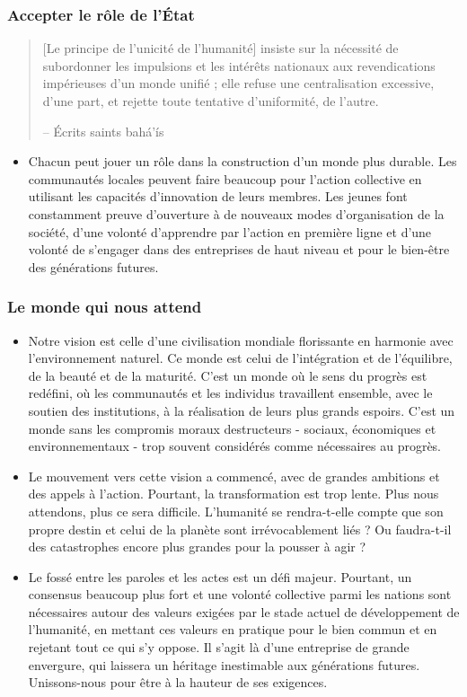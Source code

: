 \documentclass[11pt,xcolor={dvipsnames},hyperref={pdftex,pdfpagemode=UseNone,hidelinks,pdfdisplaydoctitle=true},usepdftitle=false]{beamer}
\begin{document}
\begin{frame}[allowframebreaks=0.8]
  \frametitle{Accepter le rôle de l’État}
  \begin{quote}
     [Le principe de l’unicité de l’humanité] insiste sur la nécessité de
     subordonner les impulsions et les intérêts nationaux aux revendications
     impérieuses d’un monde unifié ; elle refuse une centralisation excessive,
     d’une part, et rejette toute tentative d’uniformité, de l’autre.

    \raggedleft -- Écrits saints bahá’ís
  \end{quote}
  \begin{itemize}
    \item Chacun peut jouer un rôle dans la construction d'un monde plus
      durable. Les communautés locales peuvent faire beaucoup pour l'action
      collective en utilisant les capacités d'innovation de leurs membres. Les
      jeunes font constamment preuve d'ouverture à de nouveaux modes
      d'organisation de la société, d'une volonté d'apprendre par l'action en
      première ligne et d'une volonté de s'engager dans des entreprises de haut
      niveau et pour le bien-être des générations futures.
  \end{itemize}
\end{frame}

\begin{frame}[allowframebreaks=0.8]
  \frametitle{Le monde qui nous attend}
  \begin{itemize}
    \item Notre vision est celle d'une civilisation mondiale florissante en harmonie avec l'environnement naturel. Ce monde est celui de l'intégration et de l'équilibre, de la beauté et de la maturité. C'est un monde où le sens du progrès est redéfini, où les communautés et les individus travaillent ensemble, avec le soutien des institutions, à la réalisation de leurs plus grands espoirs. C'est un monde sans les compromis moraux destructeurs - sociaux, économiques et environnementaux - trop souvent considérés comme nécessaires au progrès.
    \item Le mouvement vers cette vision a commencé, avec de grandes ambitions et des appels à l'action. Pourtant, la transformation est trop lente. Plus nous attendons, plus ce sera difficile. L'humanité se rendra-t-elle compte que son propre destin et celui de la planète sont irrévocablement liés ? Ou faudra-t-il des catastrophes encore plus grandes pour la pousser à agir ?
    \item Le fossé entre les paroles et les actes est un défi majeur. Pourtant, un consensus beaucoup plus fort et une volonté collective parmi les nations sont nécessaires autour des valeurs exigées par le stade actuel de développement de l'humanité, en mettant ces valeurs en pratique pour le bien commun et en rejetant tout ce qui s'y oppose. Il s'agit là d'une entreprise de grande envergure, qui laissera un héritage inestimable aux générations futures. Unissons-nous pour être à la hauteur de ses exigences.
  \end{itemize}
\end{frame}

\lastslide
\end{document}
